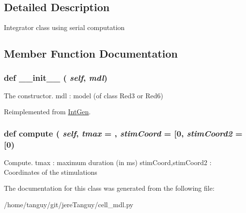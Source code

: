 \subsection{Detailed Description}
\begin{DoxyVerb}Integrator class using serial computation\end{DoxyVerb}
 

\subsection{Member Function Documentation}
\hypertarget{classcell__mdl_1_1_int_serial_ac775ee34451fdfa742b318538164070e}{
\subsubsection[{\_\-\_\-init\_\-\_\-}]{\setlength{\rightskip}{0pt plus 5cm}def \_\-\_\-init\_\-\_\- ( {\em self}, \/   {\em mdl})}}
\label{classcell__mdl_1_1_int_serial_ac775ee34451fdfa742b318538164070e}
\begin{DoxyVerb}The constructor.
mdl : model (of class Red3 or Red6)
\end{DoxyVerb}
 

Reimplemented from \hyperlink{classcell__mdl_1_1_int_gen_ac775ee34451fdfa742b318538164070e}{IntGen}.

\hypertarget{classcell__mdl_1_1_int_serial_aaa2084b96999fb1734fd2f330bfa01a6}{
\subsubsection[{compute}]{\setlength{\rightskip}{0pt plus 5cm}def compute ( {\em self}, \/   {\em tmax} = {}, \/   {\em stimCoord} = {\ttfamily \mbox{[}0}, \/   {\em stimCoord2} = {\ttfamily \mbox{[}0})}}
\label{classcell__mdl_1_1_int_serial_aaa2084b96999fb1734fd2f330bfa01a6}
\begin{DoxyVerb}Compute.
tmax : maximum duration (in ms)
stimCoord,stimCoord2 : Coordinates of the stimulations
\end{DoxyVerb}
 

The documentation for this class was generated from the following file:\begin{DoxyCompactItemize}
\item 
/home/tanguy/git/jereTanguy/cell\_\-mdl.py\end{DoxyCompactItemize}
